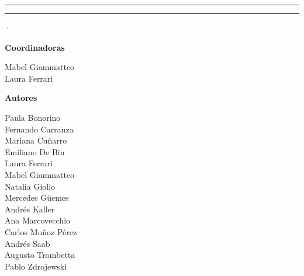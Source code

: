 \begin{titlepage}
  \raggedright
  \vspace*{30mm}
  {\color{acento}\rule{\linewidth}{1.2pt}}\par
  \vspace{8mm}
  {\sffamily\bfseries\fontsize{26}{30}\selectfont \titulolibro\par}
  \vspace{4mm}
  {\sffamily\Large\color{gristexto}\subtitulolibro\par}
  \vspace{8mm}
  {\color{acento}\rule{\linewidth}{.6pt}}\par
  \vfill
  {\large\itshape\responsables\par}
  \vspace{20mm}
  {\sffamily\small\editorial\enskip·\enskip\aniolibro\par}
\end{titlepage}
\thispagestyle{empty}
\vspace*{20mm}
{\raggedright\small
{\sffamily\bfseries Coordinadoras}\par\smallskip
Mabel Giammatteo\\
Laura Ferrari\par\bigskip
{\sffamily\bfseries Autores}\par\smallskip
Paula Bonorino\\
Fernando Carranza\\
Mariana Cuñarro\\
Emiliano De Bin\\
Laura Ferrari\\
Mabel Giammatteo\\
Natalia Giollo\\
Mercedes Güemes\\
Andrés Kaller\\
Ana Marcovecchio\\
Carlos Muñoz Pérez\\
Andrés Saab\\
Augusto Trombetta\\
Pablo Zdrojewski\par}
\cleardoublepage
